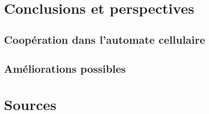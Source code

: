 \documentclass[a4paper]{article}
\begin{document}
\section{Conclusions et perspectives}
\subsection{Coopération dans l'automate cellulaire}
\subsection{Améliorations possibles}

\pagebreak
\section{Sources}
\printbibliography{}

\pagebreak
\listoffigures
\listoftables
\end{document}

